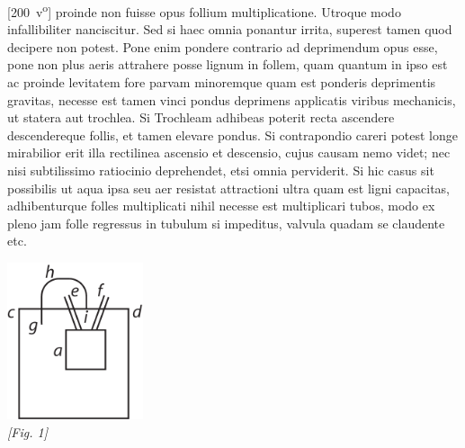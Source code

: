[200~v\textsuperscript{o}] proinde non fuisse opus follium multiplicatione. Utroque modo  infallibiliter nanciscitur. Sed si haec omnia ponantur irrita, superest tamen quod decipere non potest. Pone enim pondere contrario ad deprimendum opus esse, pone non plus aeris attrahere posse lignum in follem, quam quantum in ipso est ac proinde levitatem fore parvam minoremque quam est ponderis deprimentis gravitas\protect{}, necesse est tamen vinci pondus deprimens applicatis viribus mechanicis\protect{}, ut statera\protect{} aut trochlea\protect{}. Si Trochleam\protect{} adhibeas poterit recta ascendere descendereque follis, et tamen elevare pondus. Si contrapondio careri potest longe mirabilior erit illa rectilinea ascensio et descensio, cujus causam nemo videt; nec nisi subtilissimo ratiocinio deprehendet, etsi omnia perviderit. Si hic casus sit possibilis ut aqua ipsa seu aer resistat attractioni ultra quam est ligni capacitas, adhibenturque folles multiplicati nihil necesse est multiplicari tubos, modo ex pleno jam folle regressus in tubulum si impeditus, valvula quadam se claudente etc.\pend 
   \begin{center}                   
   \includegraphics[width=0.3\textwidth]{images/38_200v}
   \\ \textit{[Fig. 1]} \\
   \end{center}
